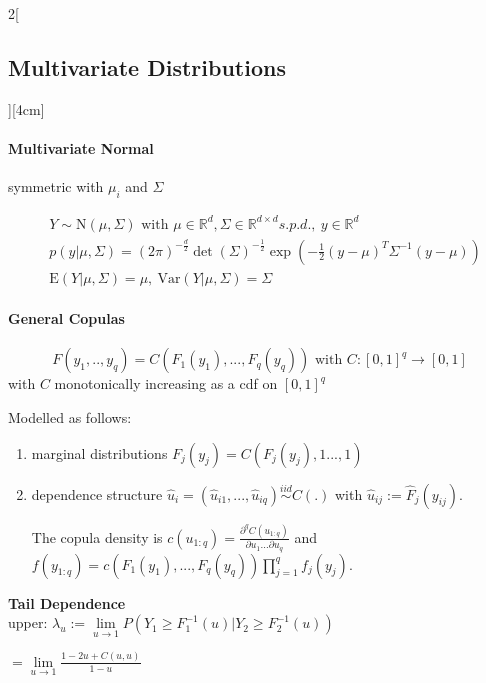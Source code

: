 \documentclass[8pt]{extarticle}
\begin{document}
\begin{multicols}{2}[\subsection{Multivariate Distributions}][4cm]

\paragraph{Multivariate Normal} symmetric with $\mu_i$ and $\Sigma$
  
    \begin{align*}
    & Y \sim \mathrm{N}(\mu, \Sigma) \text{ with } \mu \in \mathbb{R}^d, \Sigma \in \mathbb{R}^{d\times d} s.p.d.,\: y \in \mathbb{R}^d \\
    & p(y|\mu, \Sigma) = (2\pi)^{-\frac{d}{2}} \det (\Sigma)^{-\frac{1}{2}} \exp \left( -\frac{1}{2}(y-\mu)^{T} \Sigma^{-1}(y-\mu)\right) \\
    & \mathrm{E}(Y|\mu, \Sigma) = \mu ,\: \mathrm{Var}(Y|\mu, \Sigma) = \Sigma
  \end{align*}
  
  \paragraph{General Copulas}
  
  $$F(y_1,..,y_q) = C(F_1(y_1),...,F_q(y_q))\text{ with } C: \left[0,1\right]^q \rightarrow \left[0,1\right]$$
  with $C$ monotonically increasing as a cdf on $[0,1]^q$
  
  Modelled as follows:
  \begin{enumerate}
  \item marginal distributions $F_j(y_j) = C\left(F_j(y_j),1...,1\right)$
  \item dependence structure $\hat{u}_{i} = (\hat{u}_{i1},...,\hat{u}_{iq}) \overset {iid}{\sim} C(.)$ with $\hat{u}_{ij} := \hat{F}_j(y_{ij})$. 
  
  The copula density is $c(u_{1:q}) = \frac{\partial^q C(u_{1:q})}{\partial u_1...\partial u_q}$ and  $f(y_{1:q}) = c(F_1(y_1),...,F_q(y_q))\prod_{j=1}^q f_j(y_j)$.
   \end{enumerate}
   
   \textbf{Tail Dependence} \ \\
   upper: $ \lambda_{u}  := \underset{u\rightarrow 1}{\lim} P(Y_1 \geq F_1^{-1}(u)|Y_2\geq F_2^{-1}(u))$  
   
   $ = \underset{u\rightarrow 1}{\lim} \frac{1-2u+C(u,u)}{1-u}$
   

\end{multicols}
\end{document}
